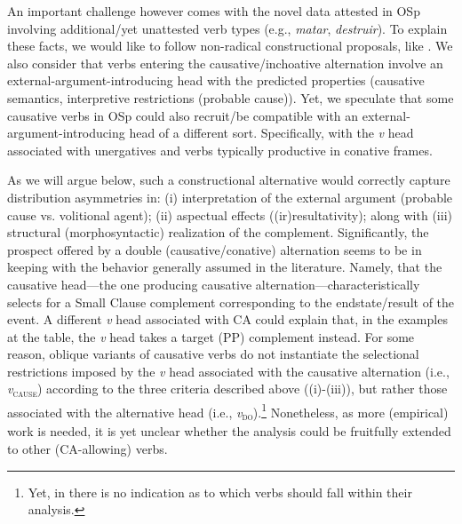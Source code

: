 \documentclass[output=paper,colorlinks,citecolor=brown,
]{langscibook}
\begin{document}
An important challenge however comes with the novel data attested in OSp involving additional/yet unattested verb types (e.g., \textit{matar}, \textit{destruir}). To explain these facts, we would like to follow non-radical constructional proposals, like \citet{FolliAndHarley2005, FolliAndHarley2007}. We also consider that verbs entering the causative/inchoative alternation involve an external-argument-introducing head with the predicted properties (causative semantics, interpretive restrictions (probable cause)). Yet, we speculate that some causative verbs in OSp could also recruit/be compatible with an external-argument-introducing head of a different sort. Specifically, with the \textit{v} head associated with unergatives and verbs typically productive in conative frames. 

As we will argue below, such a constructional alternative would correctly capture distribution asymmetries in: (i) interpretation of the external argument (probable cause vs. volitional agent); (ii) aspectual effects ((ir)resultativity); along with (iii) structural (morphosyntactic) realization of the complement. Significantly, the prospect offered by a double (causative/conative) alternation seems to be in keeping with the behavior generally assumed in the literature. Namely, that the causative head—the one producing causative alternation—characteristically selects for a Small Clause complement corresponding to the endstate/result of the event. A different \textit{v} head associated with CA could explain that, in the examples at the table, the \textit{v} head takes a target (PP) complement instead. For some reason, oblique variants of causative verbs do not instantiate the selectional restrictions imposed by the \textit{v} head associated with the causative alternation (i.e., \textit{v}\textsubscript{\textsc{cause}}) according to the three criteria described above ((i)-(iii)), but rather those associated with the alternative head (i.e., \textit{v}\textsubscript{\textsc{do}}).\footnote{Yet, in \citet{FolliAndHarley2005, FolliAndHarley2007} there is no indication as to which verbs should fall within their analysis.} Nonetheless, as more (empirical) work is needed, it is yet unclear whether the analysis could be fruitfully extended to other (CA-allowing) verbs.
\end{document}
